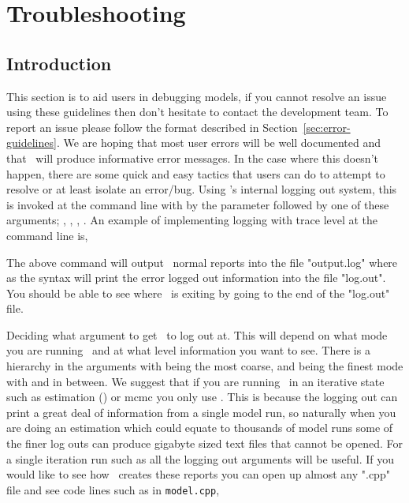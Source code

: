 \section{Troubleshooting\label{sec:trouble-shooting}}

\subsection{Introduction}
This section is to aid users in debugging models, if you cannot resolve an issue using these guidelines then don't hesitate to contact the development team. To report an issue please follow the format described in Section~\ref{sec:error-guidelines}. We are hoping that most user errors will be well documented and that \CNAME\ will produce informative error messages. In the case where this doesn't happen, there are some quick and easy tactics that users can do to attempt to resolve or at least isolate an error/bug. Using \CNAME's internal logging out system, this is invoked at the command line with by the  parameter followed by one of these arguments; , , , . An example of implementing logging with trace level at the command line is,


The above command will output \CNAME\ normal reports into the file "output.log" where as the  syntax will print the error logged out information into the file "log.out". You should be able to see where \CNAME\ is exiting by going to the end of the "log.out" file. 

Deciding what argument to get \CNAME\ to log out at. This will depend on what mode you are running \CNAME\ and at what level information you want to see. There is a hierarchy in the arguments with  being the most coarse, and  being the finest mode with  and  in between. We suggest that if you are running \CNAME\ in an iterative state such as estimation () or mcmc you only use . This is because the logging out can print a great deal of information from a single model run, so naturally when you are doing an estimation which could equate to thousands of model runs some of the finer log outs can produce gigabyte sized text files that cannot be opened. For a single iteration run such as  all the logging out arguments will be useful. If you would like to see how \CNAME\ creates these reports you can open up almost any ".cpp" file and see code lines such as in \texttt{model.cpp},


